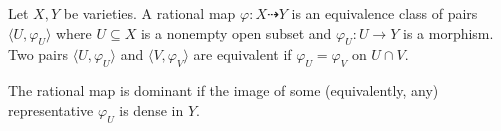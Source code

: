 Let $X, Y$ be varieties. A rational map $\varphi: X \dashrightarrow Y$ is an equivalence class of pairs $\langle U, \varphi_U \rangle$ where $U \subseteq X$ is a nonempty open subset and $\varphi_U: U \to Y$ is a morphism. Two pairs $\langle U, \varphi_U \rangle$ and $\langle V, \varphi_V \rangle$ are equivalent if $\varphi_U = \varphi_V$ on $U \cap V$.

The rational map is dominant if the image of some (equivalently, any) representative $\varphi_U$ is dense in $Y$.
